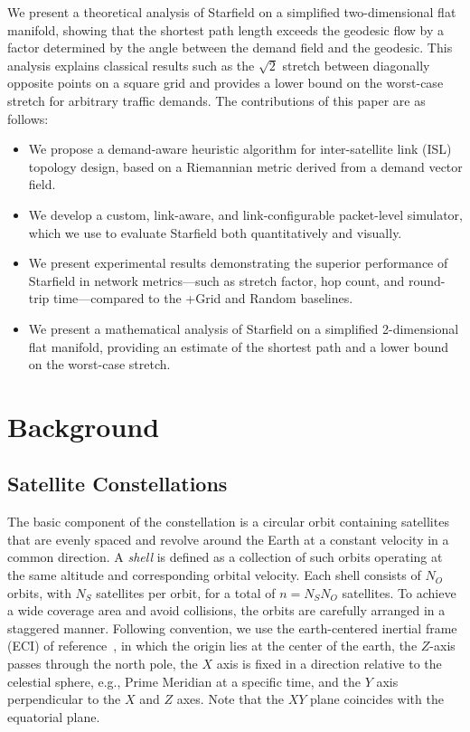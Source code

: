 \documentclass[acmsmall, screen]{acmart}
\begin{document}
We present a theoretical analysis of Starfield on a simplified two-dimensional flat manifold, showing that the shortest path length exceeds the geodesic flow by a factor determined by the angle between the demand field and the geodesic. This analysis explains classical results such as the $\sqrt{2}$ stretch between diagonally opposite points on a square grid and provides a lower bound on the worst-case stretch for arbitrary traffic demands. The contributions of this paper are as follows: 
\begin{itemize}
\item We propose a demand-aware heuristic algorithm for inter-satellite link (ISL) topology design, based on a Riemannian metric derived from a demand vector field.
\item We develop a custom, link-aware, and link-configurable packet-level simulator, which we use to evaluate Starfield both quantitatively and visually.
\item We present experimental results demonstrating the superior performance of Starfield in network metrics—such as stretch factor, hop count, and round-trip time—compared to the +Grid and Random baselines.
\item We present a mathematical analysis of Starfield on a simplified 2-dimensional flat manifold, providing an estimate of the shortest path and a lower bound on the worst-case stretch.
\end{itemize}

\section{Background}\label{background}
\subsection{Satellite Constellations}
The basic component of the constellation is a circular orbit containing satellites that are evenly spaced and revolve around the Earth at a constant velocity in a common direction. A \textit{shell} is defined as a collection of such orbits operating at the same altitude and corresponding orbital velocity. Each shell consists of $N_O$ orbits, with $N_S$ satellites per orbit, for a total of $n = N_SN_O$ satellites. To achieve a wide coverage area and avoid collisions, the orbits are carefully arranged in a staggered manner. Following convention, we use the earth-centered inertial frame (ECI) of reference~\cite{earthcenteredinertial}, in which the origin lies at the center of the earth, the $Z$-axis passes through the north pole, the $X$ axis is fixed in a direction relative to the celestial sphere, e.g., Prime Meridian at a specific time, and the $Y$ axis perpendicular to the $X$ and $Z$ axes. Note that the $XY$ plane coincides with the equatorial plane. 
\end{document}

